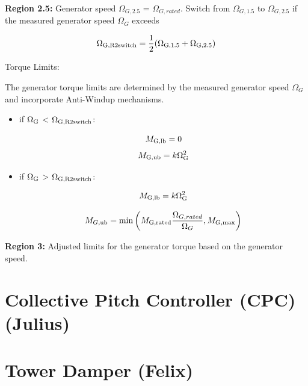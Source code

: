 \textbf{Region 2.5:} Generator speed $\Omega_{G,2.5}$ = $\Omega_{G,rated}$.
Switch from $\Omega_{G,1.5}$ to $\Omega_{G,2.5}$ if the measured generator speed $\Omega_{G}$ exceeds 

\begin{equation}
	\Omega_{\textnormal{G,R2switch}} = \frac{1}{2} (\Omega_{\textnormal{G,1.5}} + \Omega_{\textnormal{G,2.5}})
	\label{equation:Omega_Region_2.5}
\end{equation}

Torque Limits: 

The generator torque limits are determined by the measured generator speed $\Omega_{G}$ and incorporate Anti-Windup mechanisms.

\begin{itemize}
	
	\item if $\Omega_{\textnormal{G}}$ < $\Omega_{\textnormal{G,R2switch}}$:
	
	\begin{equation}
		M_{\textnormal{G,lb}} = 0
		\label{equation:MG,lb}
	\end{equation}
	\begin{equation}
		M_{\textnormal{G,ub}} = k \Omega_{\textnormal{G}}^2
		\label{equation:MG,ub}
	\end{equation}
	
	\item if $\Omega_{\textnormal{G}}$ > $\Omega_{\textnormal{G,R2switch}}$:
	
	\begin{equation}
		M_{\textnormal{G,lb}} = k \Omega_{\textnormal{G}}^2
		\label{equation:MG,lb,2}
	\end{equation}
	
	\begin{equation} 
		M_{G,\textnormal{ub}} = \min\left(M_{\textnormal{G,{rated}}}\frac{\Omega_{G,{rated}}}{\Omega_{G}}, M_{G,\text{max}}\right)
		\label{equation:MG,ub,2}
	\end{equation}
	
\end{itemize}

\textbf{Region 3:} Adjusted limits for the generator torque based on the generator speed.

\section{Collective Pitch Controller (CPC) (Julius)}


\section{Tower Damper (Felix)}

